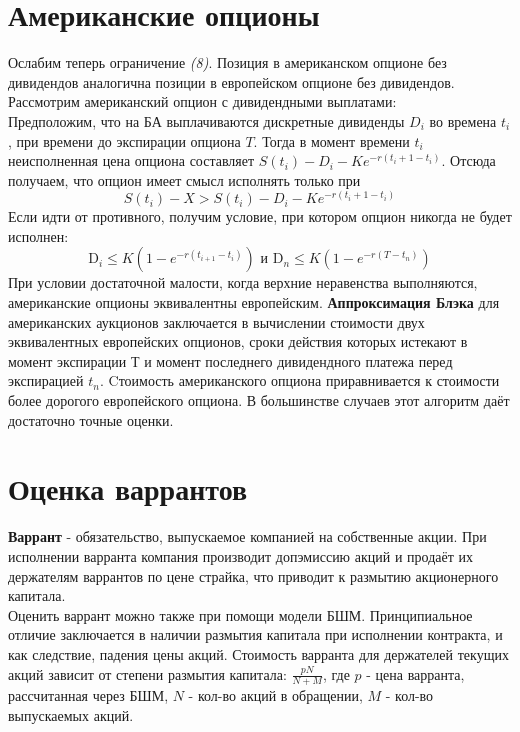 \documentclass{article}
\begin{document}
\section{Американские опционы}
Ослабим теперь ограничение \textit{(8)}. Позиция в американском опционе без дивидендов аналогична позиции в европейском опционе без дивидендов. Рассмотрим американский опцион с дивидендными выплатами:\\
Предположим, что на БА выплачиваются дискретные дивиденды $D_i$ во времена $t_i$, при времени до экспирации опциона $T$. Тогда в момент времени $t_i$ неисполненная цена опциона составляет $S(t_i)-D_i-Ke^{-r(t_i+1-t_i)}$. Отсюда получаем, что опцион имеет смысл исполнять только при
\begin{equation*}
    S(t_i)-X>S(t_i)-D_i-Ke^{-r(t_i+1-t_i)}
\end{equation*}
Если идти от противного, получим условие, при котором опцион никогда не будет исполнен:
\begin{equation*}
\mathrm{D}_i \leq K\left(1-e^{-r\left(t_{i+1}-t_i\right)}\right) \text { и } \mathrm{D}_n \leq K\left(1-e^{-r\left(T-t_n\right)}\right)
\end{equation*}
При условии достаточной малости, когда верхние неравенства выполняются, американские опционы эквивалентны европейским.
\textbf{Аппроксимация Блэка} для американских аукционов заключается в вычислении стоимости двух эквивалентных европейских опционов, сроки действия которых истекают в момент экспирации $Т$ и момент последнего дивидендного платежа перед экспирацией $t_n$. Cтоимость американского опциона приравнивается к стоимости более дорогого европейского опциона. В большинстве случаев этот алгоритм даёт достаточно точные оценки.
\section{Оценка варрантов}
\textbf{Варрант} - обязательство, выпускаемое компанией на собственные акции. При исполнении варранта компания производит допэмиссию акций и продаёт их держателям варрантов по цене страйка, что приводит к размытию акционерного капитала.\\
Оценить варрант можно также при помощи модели БШМ. Принципиальное отличие заключается в наличии размытия капитала при исполнении контракта, и как следствие, падения цены акций. Стоимость варранта для держателей текущих акций зависит от степени размытия капитала: $\frac{pN}{N+M}$, где $p$ - цена варранта, рассчитанная через БШМ, $N$ - кол-во акций в обращении, $M$ - кол-во выпускаемых акций.
\end{document}
